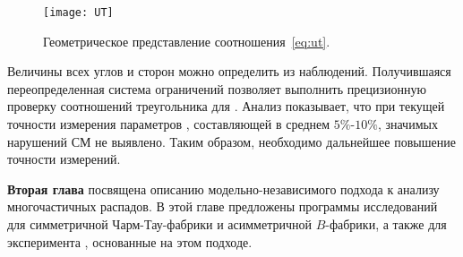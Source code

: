 \begin{figure}[h]
 \centering
  \texttt{[image: UT]}
   \caption{Геометрическое представление соотношения~\eqref{eq:ut}.}
  \label{fig:UT}
\end{figure}

Величины всех углов и сторон \ut можно определить из наблюдений. Получившаяся переопределенная система ограничений позволяет выполнить прецизионную проверку соотношений треугольника для \ut.  Анализ показывает, что при текущей точности измерения параметров \ut, составляющей в среднем $5\%$-$10\%$, значимых нарушений СМ не выявлено.  Таким образом, необходимо дальнейшее повышение точности измерений.




{\textbf{Вторая глава}} посвящена описанию модельно-независимого подхода к анализу многочастичных распадов.  В этой главе предложены программы исследований для симметричной Чарм-Тау-фабрики и асимметричной $B$-фабрики, а также для эксперимента \lhcb, основанные на этом подходе.  


